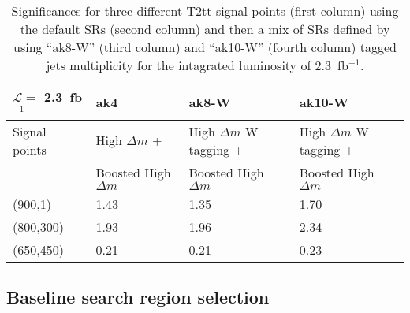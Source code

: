 \begin{table}[h]
\begin{center}
\begin{tabular}{|l|l|l|l|}
\hline
$\mathcal{L} =$ 2.3~fb$^{-1}$             & ak4~\cite{Sirunyan:2017xse}      & ak8-W & ak10-W \\
\hline
Signal points                       & High $\Delta m$ +           &  High $\Delta m$ W tagging +  &   High $\Delta m$ W tagging +  \\
                       &  Boosted High $\Delta m$    & Boosted High $\Delta m$       &   Boosted High $\Delta m$  \\
\hline
\hline
(900,1) &     1.43 & 1.35 & 1.70  \\
\hline
(800,300) &   1.93 & 1.96 & 2.34  \\
\hline
(650,450) &   0.21 & 0.21 & 0.23  \\
\hline
\end{tabular}
\caption[Table caption text]{ Significances for three different T2tt signal points (first column) using the default SRs (second column) and then a mix of SRs defined by using ``ak8-W'' (third column) and ``ak10-W'' (fourth column) tagged jets multiplicity for the intagrated luminosity of 2.3~fb$^{-1}$. }
\label{tab:taggingResults}
\end{center}
\end{table}





\subsection{Baseline search region selection~\label{sec:baseline}}

